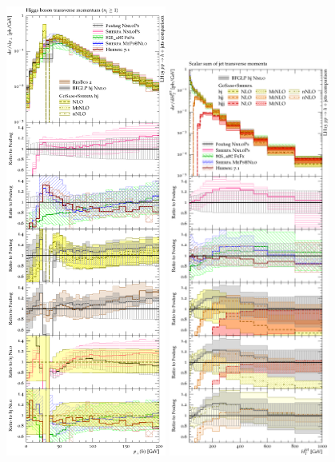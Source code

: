 \begin{figure}[t!]
  \centering
  \includegraphics[width=0.47\textwidth]{figures/hjetscomp_H_j_pT_incl.pdf}
  \quad
  \includegraphics[width=0.47\textwidth]{figures/hjetscomp_HT_jets.pdf}

\end{figure}
